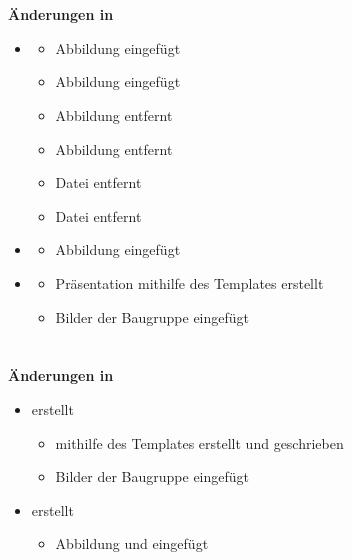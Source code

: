 		
		
\section{}
 \textbf{Änderungen in }
    \begin{itemize}
	\item {}
	    \begin{itemize}
		\item Abbildung  eingefügt
		\item Abbildung  eingefügt
		\item Abbildung  entfernt
		\item Abbildung  entfernt
		\item Datei  entfernt
		\item Datei  entfernt
     	\end{itemize}
	\item {}
	    \begin{itemize}
		\item Abbildung  eingefügt
    	\end{itemize}
    \item {}
    	\begin{itemize}
    	\item Präsentation mithilfe des Templates erstellt
    	\item Bilder der Baugruppe eingefügt
        \end{itemize}
\end{itemize}



\section{}
\textbf{Änderungen in }
\begin{itemize}
	\item {} erstellt
	\begin{itemize}
		\item {} mithilfe des Templates erstellt und geschrieben
		\item Bilder der Baugruppe eingefügt
	\end{itemize}
	\item {} erstellt
	\begin{itemize}
		\item Abbildung  und  eingefügt
	\end{itemize}
\end{itemize}
	
